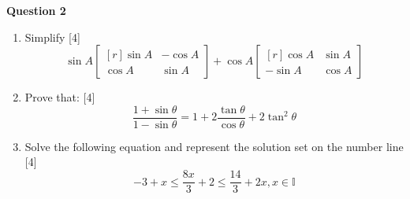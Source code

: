 \newpage
\par
\noindent
\textbf{Question 2}\\
\begin{enumerate}[label=(\roman*)]

    \item Simplify \hfill [4]
        \[ 
            \sin A \begin{bmatrix*}[r] \sin A & -\cos A \\ \cos A & \sin A \end{bmatrix*} +
            \cos A \begin{bmatrix*}[r] \cos A & \sin A \\ -\sin A & \cos A \end{bmatrix*} 
        \]

    \item Prove that: \hfill [4]
        \[
            \frac{1 + \sin \theta}{1 - \sin \theta} = 1 + 2\frac{\tan \theta}{\cos \theta} + 2 \tan^2 \theta
        \]

    \item Solve the following equation and represent the solution set on the
        number line \hfill [4]
        \[
            -3 + x \leq \frac{8x}{3} + 2 \leq \frac{14}{3} + 2x, x \in \mathbb{I}
        \]

\end{enumerate}
